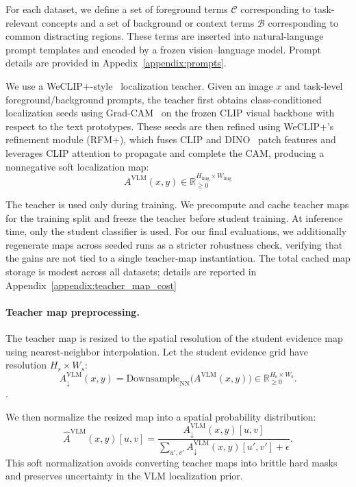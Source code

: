 For each dataset, we define a set of foreground terms $\mathcal{C}$ corresponding to task-relevant concepts and a set of background or context terms $\mathcal{B}$ corresponding to common distracting regions. These terms are inserted into natural-language prompt templates and encoded by a frozen vision--language model. Prompt details are provided in Appedix~\ref{appendix:prompts}.

We use a WeCLIP+-style~\cite{zhang2024frozen} localization teacher. Given an image $x$ and task-level foreground/background prompts, the teacher first obtains class-conditioned localization seeds using Grad-CAM~\cite{selvaraju2017grad} on the frozen CLIP visual backbone with respect to the text prototypes. These seeds are then refined using WeCLIP+'s refinement module (RFM+), which fuses CLIP and DINO~\cite{caron2021emerging} patch features and leverages CLIP attention to propagate and complete the CAM, producing a nonnegative soft localization map:
\begin{equation}
A^{\mathrm{VLM}}(x,y)\in\mathbb{R}^{H_{\mathrm{img}}\times W_{\mathrm{img}}}_{\ge 0}
\end{equation}

The teacher is used only during training. We precompute and cache teacher maps for the training split and freeze the teacher before student training. At inference time, only the student classifier is used. For our final evaluations, we additionally regenerate maps across seeded runs as a stricter robustness check, verifying that the gains are not tied to a single teacher-map instantiation. The total cached map storage is modest across all datasets; details are reported in Appendix~\ref{appendix:teacher_map_cost}


\paragraph{Teacher map preprocessing.}
The teacher map is resized to the spatial resolution of the student evidence map using nearest-neighbor interpolation. Let the student evidence grid have resolution $H_s\times W_s$:
\begin{equation}
A^{\mathrm{VLM}}_{\downarrow}(x,y)
=
\mathrm{Downsample}_{\mathrm{NN}}\big(A^{\mathrm{VLM}}(x,y)\big)
\in
\mathbb{R}^{H_{\mathrm{s}}\times W_{\mathrm{s}}}_{\ge 0}.
\end{equation}. 

We then normalize the resized map into a spatial probability distribution:
\begin{equation}
\hat{A}^{\mathrm{VLM}}(x,y)[u,v]
=
\frac{A^{\mathrm{VLM}}_{\downarrow}(x,y)[u,v]}{\sum_{u',v'} A^{\mathrm{VLM}}_{\downarrow}(x,y)[u',v']+\epsilon}.
\end{equation}
This soft normalization avoids converting teacher maps into brittle hard masks and preserves uncertainty in the VLM localization prior.

